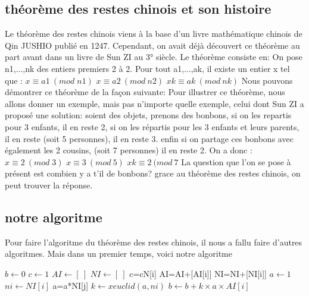 \documentclass[a4paper, 11pt]{article}
\begin{document}
\subsection{théorème des restes chinois et son histoire}
Le théorème des restes chinois viens à la base d’un livre mathématique chinois de Qin JUSHIO publié en 1247. Cependant, on avait déjà découvert ce théorème au part avant dans un livre de Sun ZI au 3° siècle. Le théorème consiste en:
On pose n1,...,nk des entiers premiers 2 à 2. Pour tout a1,...,ak, il existe un entier x tel que :
\newline
$ x\equiv a1 \: (mod \;  n1)$ 
\newline
$ x\equiv a2 \: (mod \: n2)$
\newline
$ xk \equiv ak \:(mod\: nk)$
\newline
Nous pouvons démontrer ce théorème de la façon suivante:
\newline
\newline
Pour illustrer ce théorème, nous allons donner un exemple, mais pas n'importe quelle exemple, celui dont Sun ZI a proposé une solution:
\newline
soient des objets, prenons des bonbons, si on les repartis pour 3 enfants, il en reste 2, si on les répartis
pour les 3 enfants et leurs parents, il en reste (soit 5 personnes), il en reste 3. enfin si on partage ces bonbons avec également les 2 cousins,
(soit 7 personnes) il en reste 2. On a donc :
\newline 
$ x\equiv 2 \: (mod \;  3)$ 
\newline
$ x\equiv 3 \: (mod \: 5)$
\newline
$ xk \equiv 2 \:(mod\: 7$
\newline
La question que l'on se pose à présent est combien y a t'il de bonbons?
\newline
grace au théorème des restes chinois, on peut trouver la réponse.

\newpage

\subsection{notre algoritme}
Pour faire l'algoritme du théorème des restes chinois, il nous a fallu faire d'autres algoritmes. Mais dans un premier temps, voici notre algoritme
\newline
\begin{algorithm}
    $ b \leftarrow 0$ \;
    $ c \leftarrow 1$ \;
    $ AI \leftarrow [ \:]$ \;
    $ NI \leftarrow [ \:]$ \;
    {   
        {c=c\times N[i]}
        \Else
        {
            AI=AI+[AI[i]] 
            NI=NI+[NI[i]]
        }
    }
    {
        $a \leftarrow 1 $ \;
        $ni \leftarrow NI[i]$ \;
        {
                { a=a*NI[j]}
        $k \leftarrow xeuclid(a,ni) $ \;
        $b \leftarrow b+k\times a\times AI[i] $ \; 
        }
    }
\end{algorithm}
\end{document}
